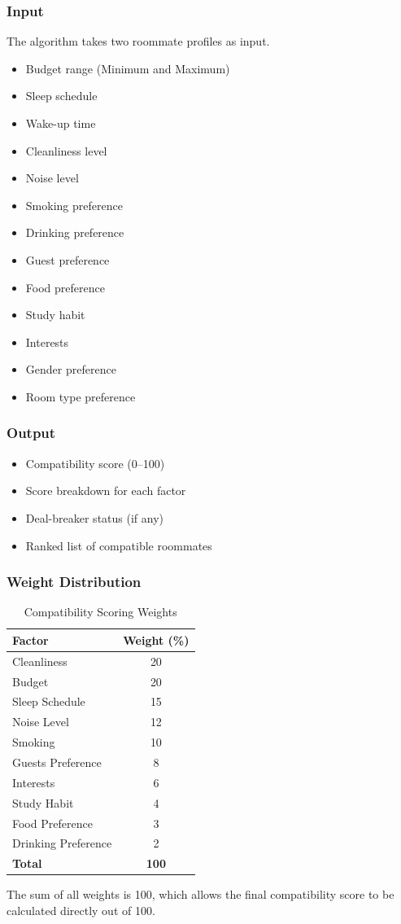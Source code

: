 \subsubsection{Input}
The algorithm takes two roommate profiles as input.
\begin{itemize}
    \item Budget range (Minimum and Maximum)
    \item Sleep schedule
    \item Wake-up time
    \item Cleanliness level
    \item Noise level
    \item Smoking preference
    \item Drinking preference
    \item Guest preference
    \item Food preference
    \item Study habit
    \item Interests
    \item Gender preference
    \item Room type preference
\end{itemize}

\subsubsection{Output}
\begin{itemize}
    \item Compatibility score (0–100)
    \item Score breakdown for each factor
    \item Deal-breaker status (if any)
    \item Ranked list of compatible roommates
\end{itemize}

\subsubsection{Weight Distribution}
\begin{table}[H]
\centering
\begin{tabular}{|l|c|}
\hline
\textbf{Factor} &  \textbf{Weight (\%)} \\
\hline
Cleanliness & 20 \\
Budget & 20 \\
Sleep Schedule & 15 \\
Noise Level & 12 \\
Smoking & 10 \\
Guests Preference & 8 \\
Interests & 6 \\
Study Habit & 4 \\
Food Preference & 3 \\
Drinking Preference & 2 \\
\hline
\textbf{Total} & \textbf{100} \\
\hline
\end{tabular}
\caption{Compatibility Scoring Weights}
\label{table:scoring_weights}
\end{table}
The sum of all weights is 100, which allows the final compatibility score to be calculated directly out of 100.

